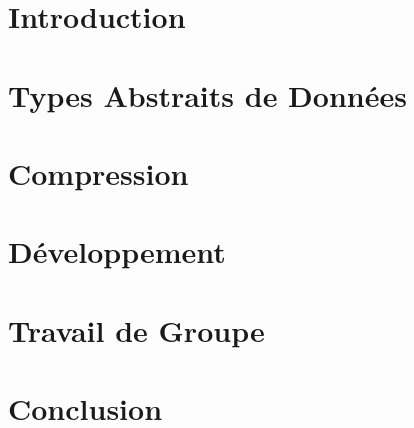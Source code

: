 \documentclass[10pt]{report}
\begin{document}
	
	
	\tableofcontents
	
	\chapter{Introduction} 
        
    
    \chapter{Types Abstraits de Données}
        

    \chapter{Compression}
        
    
    
    

    \chapter{Développement}
    

    \chapter{Travail de Groupe}
        

    \chapter{Conclusion}
        
\end{document}

